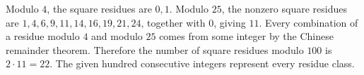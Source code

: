 Modulo $4$, the square residues are $0,1$. Modulo $25$, the nonzero square residues are $1,4,6,9,11,14,16,19,21,24$, together with $0$, giving $11$. Every combination of a residue modulo $4$ and modulo $25$ comes from some integer by the Chinese remainder theorem. Therefore the number of square residues modulo $100$ is $2\cdot11=\boxed{22}$. The given hundred consecutive integers represent every residue class.
